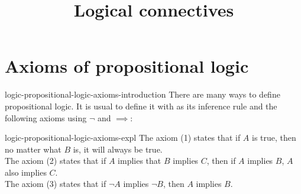 \documentclass[preview]{standalone}
\begin{document}
\title{Logical connectives}
\genpage

\section{Axioms of propositional logic}

\begin{snippet}{logic-propositional-logic-axioms-introduction}
There are many ways to define propositional logic.
It is usual to define it with  as its inference rule
and the following axioms using \(\lnot\) and \(\implies\):
\end{snippet}


\begin{snippet}{logic-propositional-logic-axioms-expl}
The axiom (1) states that if \(A\) is true, then no matter what \(B\) is, it will always be true.
\\
The axiom (2) states that if \(A\) implies that \(B\) implies \(C\), then if \(A\) implies \(B\),
\(A\) also implies \(C\).
\\
The axiom (3) states that if \(\lnot A\) implies \(\lnot B\), then \(A\) implies \(B\).
\end{snippet}
\end{document}
